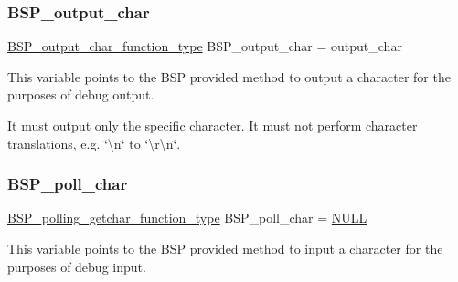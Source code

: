 \subsubsection{\texorpdfstring{BSP\_output\_char}{BSP\_output\_char}}
{\footnotesize\ttfamily \mbox{\hyperlink{bspIo_8h_a0b0dff1c3d35110ae303b4098c60dc14}{B\+S\+P\+\_\+output\+\_\+char\+\_\+function\+\_\+type}} B\+S\+P\+\_\+output\+\_\+char = output\+\_\+char}

This variable points to the B\+SP provided method to output a character for the purposes of debug output.

It must output only the specific character. It must not perform character translations, e.\+g. \char`\"{}\textbackslash{}n\char`\"{} to \char`\"{}\textbackslash{}r\textbackslash{}n\char`\"{}. \mbox{\label{arm_2altera-cyclone-v_2console_2console-config_8c_ae5846eecdfa8f2813504371bf01c29b0}} 
\subsubsection{\texorpdfstring{BSP\_poll\_char}{BSP\_poll\_char}}
{\footnotesize\ttfamily \mbox{\hyperlink{bspIo_8h_a132b9ceff428a634ece5dfaac7ef1006}{B\+S\+P\+\_\+polling\+\_\+getchar\+\_\+function\+\_\+type}} B\+S\+P\+\_\+poll\+\_\+char = \mbox{\hyperlink{bestcomm__api_8h_a872bb74de61c3689ccd5b41873fce42c}{N\+U\+LL}}}

This variable points to the B\+SP provided method to input a character for the purposes of debug input. 